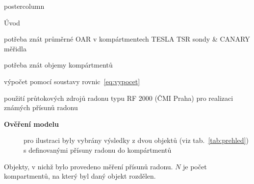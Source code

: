\documentclass{beamer}
\begin{document}
\begin{frame}
\begin{columns}
\begin{column}{.43\textwidth}
\begin{beamercolorbox}[center]{postercolumn}
\begin{minipage}{.98\textwidth}
{\begin{myblock}{Úvod}
    \vspace{7pt}
    \begin{enumerate}\setcounter{enumi}{2}
        {\setlength\itemindent{25pt}\item potřeba znát průměrné OAR v kompártmentech \textrightarrow{} TESLA TSR sondy \& CANARY měřidla}
    {\setlength\itemindent{25pt}\item potřeba znát objemy kompártmentů}
    {\setlength\itemindent{25pt}\item výpočet pomocí soustavy rovnic~\eqref{eq:vypocet}}
    {\setlength\itemindent{25pt}\item použití průtokových zdrojů radonu typu RF 2000 (ČMI Praha) pro realizaci známých přísunů radonu}
    \end{enumerate}
    \begin{description}
            \item[\textbf{Ověření modelu}] pro ilustraci byly vybrány výsledky z dvou objektů (viz tab.~\ref{tab:prehled}) s definovanými přísuny radonu do kompártmentů
    \end{description}
\begin{table}
    \scriptsize
    \centering
    \caption{Objekty, v nichž bylo provedeno měření přísunů radonu. $N$ je počet kompartmentů, na který byl daný objekt rozdělen.}
    \label{tab:prehled}
    
\end{table}
\end{myblock}\vfill


}
\end{minipage}
\end{beamercolorbox}
\end{column}
\end{columns}
\end{frame}
\end{document}
